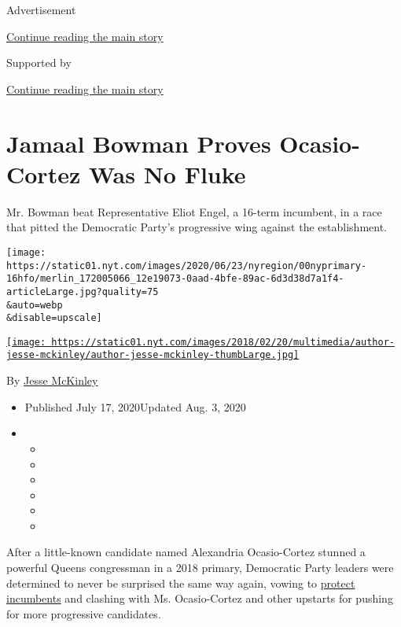 Advertisement

\protect\hyperlink{after-top}{Continue reading the main story}

Supported by

\protect\hyperlink{after-sponsor}{Continue reading the main story}

\hypertarget{jamaal-bowman-proves-ocasio-cortez-was-no-fluke}{%
\section{Jamaal Bowman Proves Ocasio-Cortez Was No
Fluke}\label{jamaal-bowman-proves-ocasio-cortez-was-no-fluke}}

Mr. Bowman beat Representative Eliot Engel, a 16-term incumbent, in a
race that pitted the Democratic Party's progressive wing against the
establishment.

\texttt{[image: https://static01.nyt.com/images/2020/06/23/nyregion/00nyprimary-16hfo/merlin\_172005066\_12e19073-0aad-4bfe-89ac-6d3d38d7a1f4-articleLarge.jpg?quality=75\\\&auto=webp\\\&disable=upscale]}

\href{https://www.nytimes.com/by/jesse-mckinley}{\texttt{[image: https://static01.nyt.com/images/2018/02/20/multimedia/author-jesse-mckinley/author-jesse-mckinley-thumbLarge.jpg]}}

By \href{https://www.nytimes.com/by/jesse-mckinley}{Jesse McKinley}

\begin{itemize}
\item
  Published July 17, 2020Updated Aug. 3, 2020
\item
  \begin{itemize}
  \item
  \item
  \item
  \item
  \item
  \item
  \end{itemize}
\end{itemize}

After a little-known candidate named Alexandria Ocasio-Cortez stunned a
powerful Queens congressman in a 2018 primary, Democratic Party leaders
were determined to never be surprised the same way again, vowing to
\href{https://thehill.com/homenews/campaign/435332-dems-seek-to-stifle-primary-challenges-to-incumbents}{protect
incumbents} and clashing with Ms. Ocasio-Cortez and other upstarts for
pushing for more progressive candidates.

